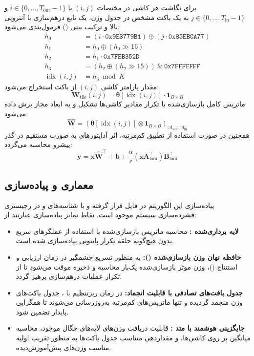 برای نگاشت هر کاشی در مختصات $(i, j)$ با $i \in \{0, \dots, T_{\text{out}}-1\}$ و $j \in \{0, \dots, T_{\text{in}}-1\}$ به یک باکت مشخص در جدول وزن، یک تابع درهم‌سازی با آنتروپی بالا و ترکیب بیتی () فرمول‌بندی می‌شود:
\begin{align}
h_0 &= (i \cdot \mathtt{0x9E3779B1}) \oplus (j \cdot \mathtt{0x85EBCA77}) \\
h_1 &= h_0 \oplus (h_0 \gg 16) \\
h_2 &= h_1 \cdot \mathtt{0x7FEB352D} \\
h_3 &= (h_2 \oplus (h_2 \gg 15)) \ \& \ \mathtt{0x7FFFFFFF} \\
\operatorname{idx}(i, j) &= h_3 \bmod K
\end{align}
مقدار پارامتر کاشی $(i, j)$ از باکت استخراج می‌شود:
\begin{equation}
\mathbf{W}_{\text{tile}}(i, j) = \boldsymbol{\theta}[\operatorname{idx}(i, j)] \cdot \mathbf{1}_{B \times B}
\end{equation}
ماتریس کامل بازسازی‌شده با تکرار مقادیر کاشی‌ها تشکیل و به ابعاد مجاز برش داده می‌شود:
\begin{equation}
\hat{\mathbf{W}} = \left( \boldsymbol{\theta}[\operatorname{idx}(i, j)] \otimes \mathbf{1}_{B \times B} \right)_{:d_{\text{out}}, :d_{\text{in}}}
\end{equation}
همچنین در صورت استفاده از تطبیق کم‌مرتبه، اثر آداپتورهای  به صورت مستقیم در گذر پیشرو محاسبه می‌گردد:
\begin{equation}
\mathbf{y} = \mathbf{x} \hat{\mathbf{W}}^\top + \mathbf{b} + \frac{\alpha}{r} (\mathbf{x} \mathbf{A}_{\text{lora}}^\top) \mathbf{B}_{\text{lora}}^\top
\end{equation}

\subsection{معماری و پیاده‌سازی}
پیاده‌سازی این الگوریتم در فایل  قرار گرفته و با شناسه‌های  و  در رجیستری فشرده‌سازی سیستم موجود است. نقاط تمایز پیاده‌سازی عبارتند از:
\begin{itemize}
    \item \textbf{لایه برداری‌شده :} محاسبه ماتریس بازسازی‌شده با استفاده از عملگرهای سریع  بدون هیچ‌گونه حلقه تکرار پایتونی پیاده‌سازی شده است.
    \item \textbf{حافظه نهان وزن بازسازی‌شده ():} به منظور تسریع چشمگیر در زمان ارزیابی و استنتاج ()، وزن موثر بازسازی‌شده یک‌بار محاسبه و ذخیره موقت می‌شود تا از تکرار عملیات درهم‌سازی پرهیز گردد.
    \item \textbf{جدول بافت‌های تصادفی با قابلیت انجماد:} در زمان ریزتنظیم با ، جدول باکت‌های وزن منجمد گردیده و تنها ماتریس‌های کم‌مرتبه به‌روزرسانی می‌شوند تا همگرایی پایدار تضمین شود.
    \item \textbf{جایگزینی هوشمند با متد :} قابلیت دریافت وزن‌های لایه‌های چگال موجود، محاسبه میانگین بر روی کاشی‌ها، و مقداردهی متناسب جدول باکت‌ها به منظور تقریب اولیه مناسب وزن‌های پیش‌آموزش‌دیده.
\end{itemize}

